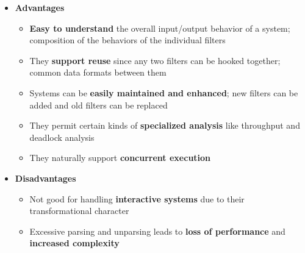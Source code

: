 \documentclass[12pt]{book}
\begin{document}
\begin{itemize}
    
    \item \textbf{Advantages}
    \begin{itemize}
        \item \textbf{Easy to understand} the overall input/output behavior of a system; composition of the behaviors of the individual filters
        \item They \textbf{support reuse} since any two filters can be hooked together; common data formats between them
        \item Systems can be \textbf{easily maintained and enhanced}; new filters can be added and old filters can be replaced
        \item They permit certain kinds of \textbf{specialized analysis} like throughput and deadlock analysis
        \item They naturally support \textbf{concurrent execution}
    \end{itemize} 

    \item \textbf{Disadvantages}
    \begin{itemize}
        \item Not good for handling \textbf{interactive systems} due to their transformational character
        \item Excessive parsing and unparsing leads to \textbf{loss of performance} and \textbf{increased complexity}
    \end{itemize}
\end{itemize}
\end{document}
